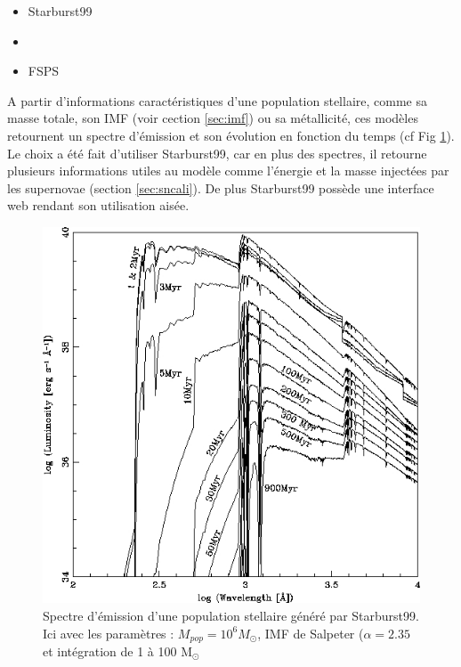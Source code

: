 \begin{itemize}
\item Starburst99 \cite{leitherer_starburst99:_1999} 
\item \cite{2003MNRAS.344.1000B}
\item FSPS \cite{2009ApJ...699..486C}
\end{itemize}

A partir d'informations caractéristiques d'une population stellaire, comme sa masse totale, son \ac{IMF} (voir cection \ref{sec:imf}) ou sa métallicité, ces modèles retournent un spectre d'émission et son évolution en fonction du temps (cf Fig \ref{fig:spectre_starburst}).
Le choix a été fait d'utiliser Starburst99, car en plus des spectres, il retourne plusieurs informations utiles au modèle comme l'énergie et la masse injectées par les supernovae (section \ref{sec:sncali}).
De plus Starburst99 possède une interface web rendant son utilisation aisée.

\begin{figure}
        \includegraphics[width=.95\linewidth]{img/03/spectre_starburst.jpg} 
        \caption[Spectres Starburst99]{Spectre d'émission d'une population stellaire généré par Starburst99.
        Ici avec les paramètres : $M_{pop}=10^6 M_\odot$, \ac{IMF} de Salpeter ($\alpha=2.35$ et intégration de 1 à 100 M$_\odot$ 
 		\label{fig:spectre_starburst}}
\end{figure}

